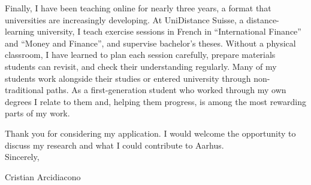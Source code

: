 \documentclass[11pt]{article}
\begin{document}
Finally, I have been teaching online for nearly three years, a format that universities are increasingly developing. At UniDistance Suisse, a distance-learning university, I teach exercise sessions in French in ``International Finance'' and ``Money and Finance'', and supervise bachelor's theses. Without a physical classroom, I have learned to plan each session carefully, prepare materials students can revisit, and check their understanding regularly. Many of my students work alongside their studies or entered university through non-traditional paths. As a first-generation student who worked through my own degrees I relate to them and, helping them progress, is among the most rewarding parts of my work. %

Thank you for considering my application. I would welcome the opportunity to discuss my research and what I could contribute to Aarhus. \\

Sincerely,

Cristian Arcidiacono
\end{document}
